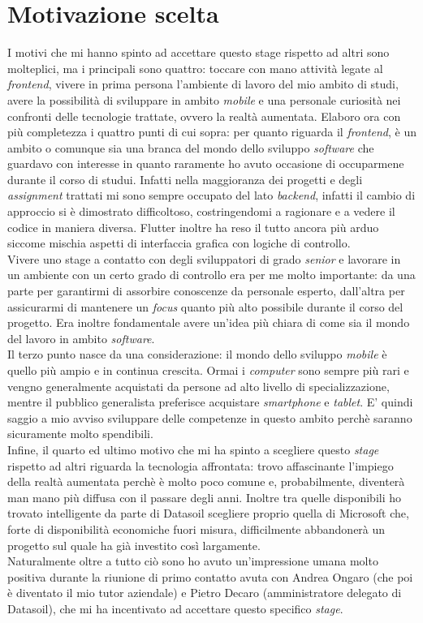 \section{Motivazione scelta}
I motivi che mi hanno spinto ad accettare questo stage rispetto ad altri sono molteplici, ma i principali sono quattro: toccare con mano attività legate al \textit{frontend}, vivere in prima persona l'ambiente di lavoro del mio ambito di studi, avere la possibilità di sviluppare in ambito \textit{mobile} e una personale curiosità nei confronti delle tecnologie trattate, ovvero la realtà aumentata.
Elaboro ora con più completezza i quattro punti di cui sopra: per quanto riguarda il \textit{frontend}, è un ambito o comunque sia una branca del mondo dello sviluppo \textit{software} che guardavo con interesse in quanto raramente ho avuto occasione di occuparmene durante il corso di studui. Infatti nella maggioranza dei progetti e degli \textit{assignment} trattati mi sono sempre occupato del lato \textit{backend}, infatti il cambio di approccio si è dimostrato difficoltoso, costringendomi a ragionare e a vedere il codice in maniera diversa. Flutter inoltre ha reso il tutto ancora più arduo siccome mischia aspetti di interfaccia grafica con logiche di controllo.\\
Vivere uno stage a contatto con degli sviluppatori di grado \textit{senior} e lavorare in un ambiente con un certo grado di controllo era per me molto importante: da una parte per garantirmi di assorbire conoscenze da personale esperto, dall'altra per assicurarmi di mantenere un \textit{focus} quanto più alto possibile durante il corso del progetto. Era inoltre fondamentale avere un'idea più chiara di come sia il mondo del lavoro in ambito \textit{software}.\\
Il terzo punto nasce da una considerazione: il mondo dello sviluppo \textit{mobile} è quello più ampio e in continua crescita. Ormai i \textit{computer} sono sempre più rari e vengno generalmente acquistati da persone ad alto livello di specializzazione, mentre il pubblico generalista preferisce acquistare \textit{smartphone} e \textit{tablet}. E' quindi saggio a mio avviso sviluppare delle competenze in questo ambito perchè saranno sicuramente molto spendibili.\\
Infine, il quarto ed ultimo motivo che mi ha spinto a scegliere questo \textit{stage} rispetto ad altri riguarda la tecnologia affrontata: trovo affascinante l'impiego della realtà aumentata perchè è molto poco comune e, probabilmente, diventerà man mano più diffusa con il passare degli anni. Inoltre tra quelle disponibili ho trovato intelligente da parte di Datasoil scegliere proprio quella di Microsoft che, forte di disponibilità economiche fuori misura, difficilmente abbandonerà un progetto sul quale ha già investito così largamente.\\
Naturalmente oltre a tutto ciò sono ho avuto un'impressione umana molto positiva durante la riunione di primo contatto avuta con Andrea Ongaro (che poi è diventato il mio tutor aziendale) e Pietro Decaro (amministratore delegato di Datasoil), che mi ha incentivato ad accettare questo specifico \textit{stage}.
